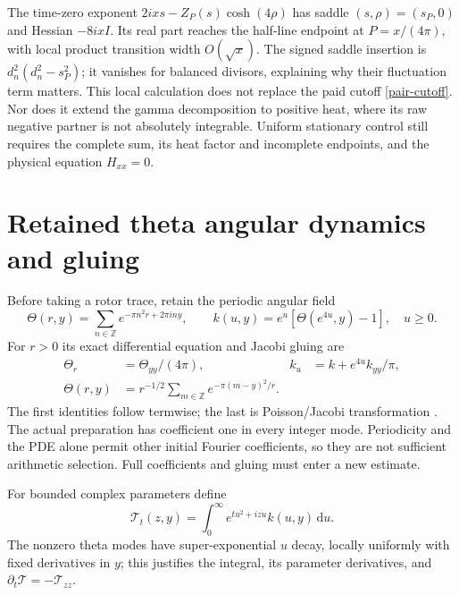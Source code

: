 \documentclass[11pt]{article}
\theoremstyle{definition}
\theoremstyle{remark}
\newcommand{\dd}{\,\mathrm d}
\begin{document}
The time-zero exponent $2ixs-Z_P(s)\cosh(4\rho)$ has saddle
$(s,\rho)=(s_P,0)$ and Hessian $-8ixI$.
Its real part reaches the half-line endpoint at $P=x/(4\pi)$, with
local product transition width $O(\sqrt x)$.
The signed saddle insertion is $d_n^2(d_n^2-s_P^2)$; it vanishes
for balanced divisors, explaining why their fluctuation term matters.
This local calculation does not replace the paid cutoff
\eqref{pair-cutoff}. Nor does it extend the gamma decomposition to
positive heat, where its raw negative partner is not absolutely integrable.
Uniform stationary control still requires the complete sum, its heat
factor and incomplete endpoints, and the physical equation $H_{xx}=0$.


\section{Retained theta angular dynamics and gluing}
\label{sec:angular}

Before taking a rotor trace, retain the periodic angular field
\begin{equation}
 \Theta(r,y)=\sum_{n\in\mathbb Z}e^{-\pi n^2r+2\pi iny},
 \qquad k(u,y)=e^u[\Theta(e^{4u},y)-1],\quad u\ge0.
 \label{eq:angular}
\end{equation}
For $r>0$ its exact differential equation and Jacobi gluing are
\begin{align}
 \Theta_r&=\Theta_{yy}/(4\pi),
 &k_u&=k+e^{4u}k_{yy}/\pi,\label{eq:angular-pde}\\
 \Theta(r,y)&=r^{-1/2}\sum_{m\in\mathbb Z}
                        e^{-\pi(m-y)^2/r}.\label{eq:jacobi}
\end{align}
The first identities follow termwise; the last is Poisson/Jacobi
transformation \cite{dlmftheta}. The actual preparation has coefficient
one in every integer mode. Periodicity and the PDE alone permit other
initial Fourier coefficients, so they are not sufficient arithmetic
selection. Full coefficients and gluing must enter a new estimate.

For bounded complex parameters define
\begin{equation}
 \mathcal T_t(z,y)=\int_0^\infty e^{tu^2+izu}k(u,y)\dd u.
 \label{eq:Tfield}
\end{equation}
The nonzero theta modes have super-exponential $u$ decay, locally
uniformly with fixed derivatives in $y$; this justifies the integral,
its parameter derivatives, and $\partial_t\mathcal T=-\mathcal T_{zz}$.
\end{document}
